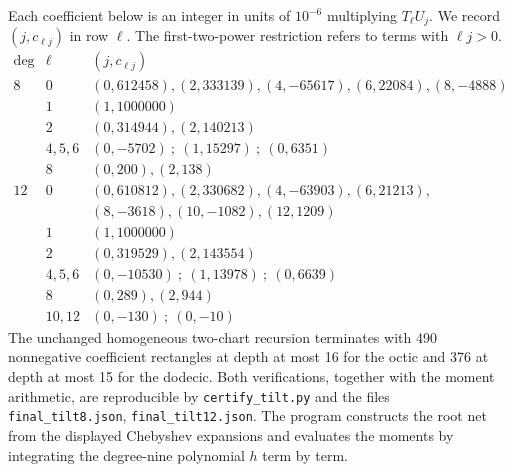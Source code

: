 \documentclass[11pt]{article}
\begin{document}
Each coefficient below is an integer in units of $10^{-6}$ multiplying $T_\ell U_j$. We record $(j,c_{\ell j})$ in row $\ell$. The first-two-power restriction refers to terms with $\ell j>0$.
\[
\begin{array}{c|r|l}
\deg&\ell&(j,c_{\ell j})\\\hline
8&0&(0,612458),(2,333139),(4,-65617),(6,22084),(8,-4888)\\
&1&(1,1000000)\\
&2&(0,314944),(2,140213)\\
&4,5,6&(0,-5702)\ ;\ (1,15297)\ ;\ (0,6351)\\
&8&(0,200),(2,138)\\ \hline
12&0&(0,610812),(2,330682),(4,-63903),(6,21213),\\
&& (8,-3618),(10,-1082),(12,1209)\\
&1&(1,1000000)\\
&2&(0,319529),(2,143554)\\
&4,5,6&(0,-10530)\ ;\ (1,13978)\ ;\ (0,6639)\\
&8&(0,289),(2,944)\\
&10,12&(0,-130)\ ;\ (0,-10)
\end{array}
\]
The unchanged homogeneous two-chart recursion terminates with 490 nonnegative coefficient rectangles at depth at most 16 for the octic and 376 at depth at most 15 for the dodecic. Both verifications, together with the moment arithmetic, are reproducible by \texttt{certify\_tilt.py} and the files \texttt{final\_tilt8.json}, \texttt{final\_tilt12.json}. The program constructs the root net from the displayed Chebyshev expansions and evaluates the moments by integrating the degree-nine polynomial $h$ term by term.
\end{document}
